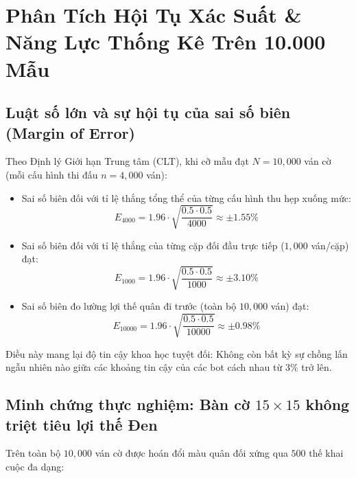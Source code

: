 \documentclass[11pt,a4paper]{article}
\begin{document}
\FloatBarrier
\section{Phân Tích Hội Tụ Xác Suất \& Năng Lực Thống Kê Trên 10.000 Mẫu}

\subsection{Luật số lớn và sự hội tụ của sai số biên (Margin of Error)}
Theo Định lý Giới hạn Trung tâm (CLT), khi cỡ mẫu đạt $N = 10{,}000$ ván cờ (mỗi cấu hình thi đấu $n = 4{,}000$ ván):
\begin{itemize}
    \item Sai số biên đối với tỉ lệ thắng tổng thể của từng cấu hình thu hẹp xuống mức:
    \begin{equation}
    E_{4000} = 1.96 \cdot \sqrt{\frac{0.5 \cdot 0.5}{4000}} \approx \pm 1.55\%
    \end{equation}
    \item Sai số biên đối với tỉ lệ thắng của từng cặp đối đầu trực tiếp ($1{,}000$ ván/cặp) đạt:
    \begin{equation}
    E_{1000} = 1.96 \cdot \sqrt{\frac{0.5 \cdot 0.5}{1000}} \approx \pm 3.10\%
    \end{equation}
    \item Sai số biên đo lường lợi thế quân đi trước (toàn bộ $10{,}000$ ván) đạt:
    \begin{equation}
    E_{10000} = 1.96 \cdot \sqrt{\frac{0.5 \cdot 0.5}{10000}} \approx \pm 0.98\%
    \end{equation}
\end{itemize}

Điều này mang lại độ tin cậy khoa học tuyệt đối: Không còn bất kỳ sự chồng lấn ngẫu nhiên nào giữa các khoảng tin cậy của các bot cách nhau từ $3\%$ trở lên.

\subsection{Minh chứng thực nghiệm: Bàn cờ $15 \times 15$ không triệt tiêu lợi thế Đen}
Trên toàn bộ $10{,}000$ ván cờ được hoán đổi màu quân đối xứng qua $500$ thế khai cuộc đa dạng:
\end{document}
